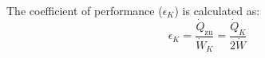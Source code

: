 The coefficient of performance (\( \epsilon_K \)) is calculated as:  
\[
\epsilon_K = \frac{\dot{Q}_{\text{zu}}}{\dot{W}_K} = \frac{\dot{Q}_K}{2 \dot{W}}
\]